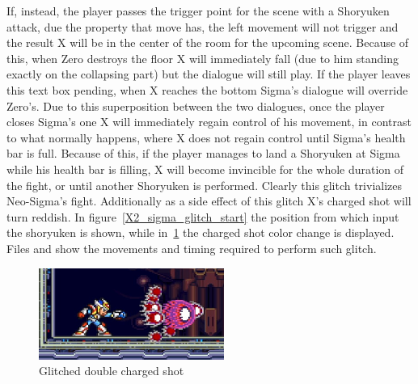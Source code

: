 If, instead, the player passes the trigger point for the scene with a Shoryuken attack, due the property that move has, the left movement will not trigger and the result X will be in the center of the room for the upcoming scene. Because of this, when Zero destroys the floor X will immediately fall (due to him standing exactly on the collapsing part) but the dialogue will still play. If the player leaves this text box pending, when X reaches the bottom Sigma's dialogue will override Zero's. Due to this superposition between the two dialogues, once the player closes Sigma's one X will immediately regain control of his movement, in contrast to what normally happens, where X does not regain control until Sigma's health bar is full. Because of this, if the player manages to land a Shoryuken at Sigma while his health bar is filling, X will become invincible for the whole duration of the fight, or until another Shoryuken is performed. Clearly this glitch trivializes Neo-Sigma's fight. Additionally as a side effect of this glitch X's charged shot will turn reddish.
In figure~\ref{X2_sigma_glitch_start} the position from which input the shoryuken is shown, while in~\ref{X2_glitch_shot} the charged shot color change is displayed. Files  and  show the movements and timing required to perform such glitch.


\begin{figure}[htp]
	\centering
	\includegraphics[height=3cm]{figures/X2/Miscs/glithced_double_shot.png}
	\caption{Glitched double charged shot}
	\label{X2_glitch_shot}
\end{figure}

